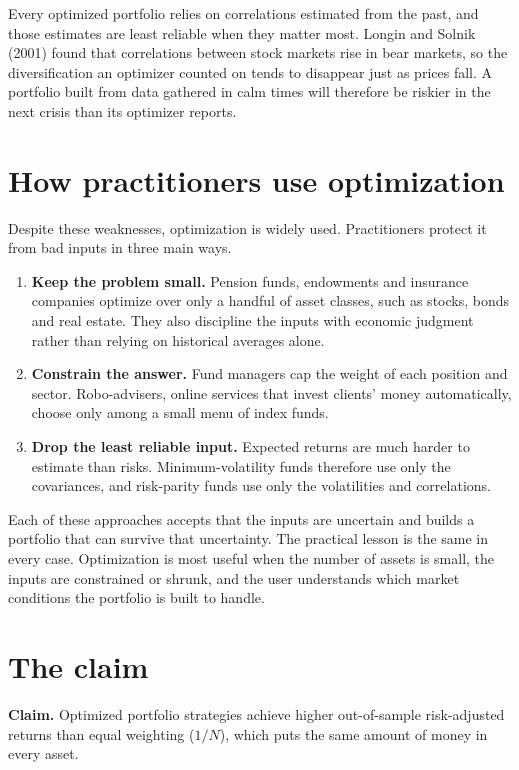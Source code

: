 Every optimized portfolio relies on correlations estimated from the past, and those estimates are least reliable when they matter most. Longin and Solnik (2001) found that correlations between stock markets rise in bear markets, so the diversification an optimizer counted on tends to disappear just as prices fall. A portfolio built from data gathered in calm times will therefore be riskier in the next crisis than its optimizer reports.


\section{How practitioners use optimization}
\label{sec:12-practice}

Despite these weaknesses, optimization is widely used. Practitioners protect it from bad inputs in three main ways.

\begin{enumerate}
  \item \textbf{Keep the problem small.} Pension funds, endowments and insurance companies optimize over only a handful of asset classes, such as stocks, bonds and real estate. They also discipline the inputs with economic judgment rather than relying on historical averages alone.
  \item \textbf{Constrain the answer.} Fund managers cap the weight of each position and sector. Robo-advisers, online services that invest clients' money automatically, choose only among a small menu of index funds.
  \item \textbf{Drop the least reliable input.} Expected returns are much harder to estimate than risks. Minimum-volatility funds therefore use only the covariances, and risk-parity funds use only the volatilities and correlations.
\end{enumerate}

Each of these approaches accepts that the inputs are uncertain and builds a portfolio that can survive that uncertainty. The practical lesson is the same in every case. Optimization is most useful when the number of assets is small, the inputs are constrained or shrunk, and the user understands which market conditions the portfolio is built to handle.
\section{The claim}
\label{sec:12-claim}

\begin{callout}
\textbf{Claim.} Optimized portfolio strategies achieve higher out-of-sample risk-adjusted returns than equal weighting ($1/N$), which puts the same amount of money in every asset.
\end{callout}

